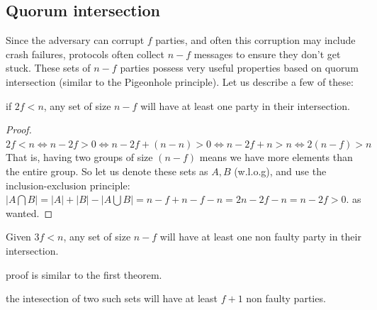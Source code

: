 \subsection{Quorum intersection}
Since the adversary can corrupt $f$ parties, and often this corruption may include crash failures,
 protocols often collect $n-f$ messages to ensure they don't get stuck.
  These sets of $n-f$ parties possess very useful properties based on quorum intersection
   (similar to the Pigeonhole principle).
   Let us describe a few of these:

\begin{theorem}
    if $2f<n$, any set of size $n-f$  will have at least one party in their
    intersection.
\end{theorem} 
 \begin{proof}
    $2f<n \iff n-2f>0 \iff n-2f +(n-n) >0 \iff n-2f+n>n \iff 2(n-f)>n$
    That is, having two groups of size $(n-f)$ means we have more elements than the entire group.
    So let us denote these sets as $A,B$ (w.l.o.g), and use the 
    inclusion-exclusion principle:
    $|A\bigcap B| = |A| + |B| - |A\bigcup B| = n-f + n-f - n = 2n - 2f - n = n - 2f > 0$.
    as wanted.
 \end{proof}

\begin{theorem}
    Given $3f<n$, any set of size $n-f$ will have at least one non faulty party in their intersection.
\end{theorem}
proof is similar to the first theorem.

\begin{corollary}
    the intesection of two such sets will have at least $f+1$ non faulty parties.
\end{corollary}

    
